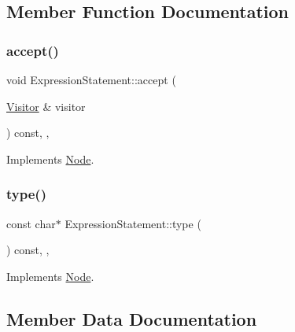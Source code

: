 \subsection{Member Function Documentation}
\mbox{\label{struct_expression_statement_a6463f779ec4140b2510d854726aefd40}} 
\subsubsection{\texorpdfstring{accept()}{accept()}}
{\footnotesize\ttfamily void Expression\+Statement\+::accept (\begin{DoxyParamCaption}\item[{\hyperlink{struct_visitor}{Visitor} \&}]{visitor }\end{DoxyParamCaption}) const\hspace{0.3cm}{\ttfamily [inline]}, {\ttfamily [override]}, {\ttfamily [virtual]}}



Implements \hyperlink{struct_node_a10bd7af968140bbf5fa461298a969c71}{Node}.

\mbox{\label{struct_expression_statement_a39b8f80f97a0a5f346c1e34f1ba6939c}} 
\subsubsection{\texorpdfstring{type()}{type()}}
{\footnotesize\ttfamily const char$\ast$ Expression\+Statement\+::type (\begin{DoxyParamCaption}{ }\end{DoxyParamCaption}) const\hspace{0.3cm}{\ttfamily [inline]}, {\ttfamily [override]}, {\ttfamily [virtual]}}



Implements \hyperlink{struct_node_a82f29420d0a38efcc370352528e94e9b}{Node}.



\subsection{Member Data Documentation}
\mbox{\label{struct_expression_statement_af8fa751297f7dd719ebe74d62201fc3a}} 
